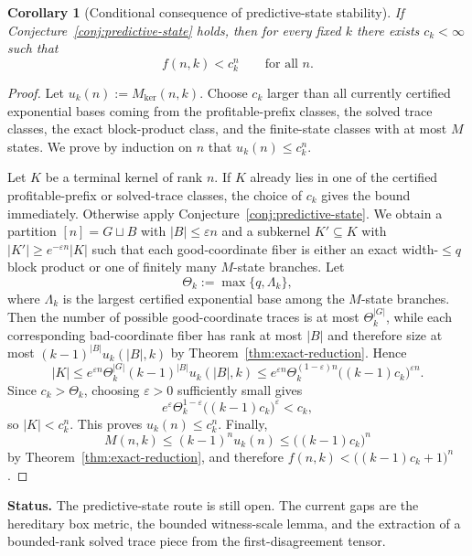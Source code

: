 \documentclass[11pt]{article}
\newtheorem{corollary}[theorem]{Corollary}
\theoremstyle{definition}
\newcommand{\eps}{\varepsilon}
\newcommand{\1}{\mathbf{1}}
\newcommand{\status}[1]{\par\smallskip\noindent\textbf{Status.} #1\par\smallskip}
\begin{document}
\begin{corollary}[Conditional consequence of predictive-state stability]\label{cor:predictive-state-exp}
If Conjecture~\ref{conj:predictive-state} holds, then for every fixed $k$ there exists $c_k<\infty$ such that
\[
f(n,k)<c_k^n
\qquad\text{for all }n.
\]
\end{corollary}

\begin{proof}
Let $u_k(n):=M_{\ker}(n,k)$. Choose $c_k$ larger than all currently certified exponential bases coming from the profitable-prefix classes, the solved trace classes, the exact block-product class, and the finite-state classes with at most $M$ states. We prove by induction on $n$ that $u_k(n)\le c_k^n$.

Let $K$ be a terminal kernel of rank $n$. If $K$ already lies in one of the certified profitable-prefix or solved-trace classes, the choice of $c_k$ gives the bound immediately. Otherwise apply Conjecture~\ref{conj:predictive-state}. We obtain a partition $[n]=G\sqcup B$ with $|B|\le \eps n$ and a subkernel $K'\subseteq K$ with $|K'|\ge e^{-\eps n}|K|$ such that each good-coordinate fiber is either an exact width-$\le q$ block product or one of finitely many $M$-state branches. Let
\[
\Theta_k:=\max\{q,\Lambda_k\},
\]
where $\Lambda_k$ is the largest certified exponential base among the $M$-state branches. Then the number of possible good-coordinate traces is at most $\Theta_k^{|G|}$, while each corresponding bad-coordinate fiber has rank at most $|B|$ and therefore size at most $(k-1)^{|B|}u_k(|B|,k)$ by Theorem~\ref{thm:exact-reduction}. Hence
\[
|K|\le e^{\eps n}\Theta_k^{|G|}(k-1)^{|B|}u_k(|B|,k)
\le e^{\eps n}\Theta_k^{(1-\eps)n}\bigl((k-1)c_k\bigr)^{\eps n}.
\]
Since $c_k>\Theta_k$, choosing $\eps>0$ sufficiently small gives
\[
e^{\eps}\Theta_k^{1-\eps}\bigl((k-1)c_k\bigr)^\eps<c_k,
\]
so $|K|<c_k^n$. This proves $u_k(n)\le c_k^n$. Finally,
\[
M(n,k)\le (k-1)^n u_k(n)\le \bigl((k-1)c_k\bigr)^n
\]
by Theorem~\ref{thm:exact-reduction}, and therefore $f(n,k)<\bigl((k-1)c_k+1\bigr)^n$.
\end{proof}

\status{The predictive-state route is still open. The current gaps are the hereditary box metric, the bounded witness-scale lemma, and the extraction of a bounded-rank solved trace piece from the first-disagreement tensor.}
\end{document}

